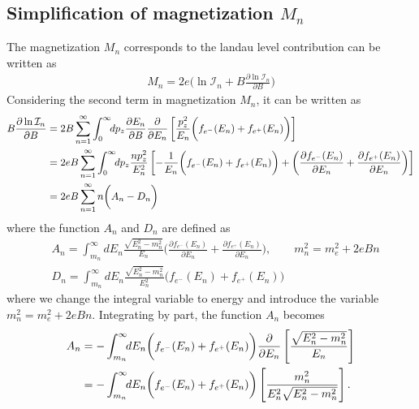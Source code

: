 \documentclass[sn-mathphys,Numbered]{sn-jnl}
\begin{document}
\subsection{Simplification of magnetization $M_n$}
The magnetization $M_n$ corresponds to the landau level contribution can be written as
\begin{align}
M_n=2e\bigg(\ln\mathcal{I}_{n}+B\frac{\partial\ln\mathcal{I}_n}{\partial B}\bigg)
\end{align}
Considering the second term in magnetization $M_n$, it can be written as
\begin{align}
B\frac{\partial\ln\mathcal{I}_n}{\partial B}&=2B \sum_{n=1}^\infty\int_0^\infty\!\!dp_z \frac{\partial E_n}{\partial B}\frac{\partial}{\partial E_n}\left[\frac{p_z^2}{E_{n}}\bigg(f_{e^-}(E_n)+f_{e^+}(E_n)\bigg)\right]\notag\\
&=2eB \sum_{n=1}^\infty\int_0^\infty\!\!dp_z \frac{n p_z^2}{E^2_{n}}\left[-\frac{1}{E_{n}}\bigg(f_{e^-}(E_n)+f_{e^+}(E_n)\bigg)+\bigg(\frac{\partial f_{e^-}(E_n)}{\partial E_n}+\frac{\partial f_{e^+}(E_n)}{\partial E_n}\bigg)\right]\notag\\
&=2eB\sum_{n=1}^\infty n\bigg(A_n-D_n\bigg)\label{Eq001_appendix}
\end{align}
where the function $A_n$ and $D_n$ are defined as
\begin{align}
\label{Function_A}
&A_n=\int_{m_n}^\infty\!\!dE_n \frac{\sqrt{E^2_n-m^2_n}}{E_{n}}\bigg(\frac{\partial f_{e^-}(E_n)}{\partial E_n}+\frac{\partial f_{e^+}(E_n)}{\partial E_n}\bigg),\qquad m_n^2=m^2_e+2eBn\\ 
\label{Function_D}
&D_n=\int_{m_n}^\infty\!\!dE_n \frac{\sqrt{E^2_n-m^2_n}}{E^2_{n}}\bigg(f_{e^-}(E_n)+f_{e^+}(E_n)\bigg)
\end{align}
where we change the integral variable to energy and introduce the variable $m_n^2=m^2_e+2eBn$. Integrating by part, the function $A_n$ becomes
\begin{align}
A_n&=-\int_{m_n}^\infty\!\!dE_n \bigg(f_{e^-}(E_n)+f_{e^+}(E_n)\bigg)\frac{\partial}{\partial E_n}\left[\frac{\sqrt{E^2_n-m^2_n}}{E_{n}}\right]\notag\\
&=-\int_{m_n}^\infty\!\!dE_n \bigg(f_{e^-}(E_n)+f_{e^+}(E_n)\bigg)\left[\frac{m^2_n}{E^2_{n}\sqrt{E^2_n-m^2_n}}\right].
\end{align}
\end{document}
